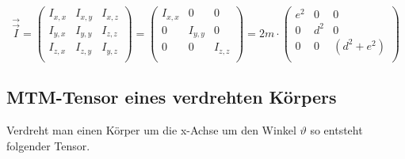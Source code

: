 \begin{equation}
    \vec{\vec{I}} =
    \begin{pmatrix}
        I_{x,x} & I_{x,y} & I_{x,z} \\
        I_{y,x} & I_{y,y} & I_{z,z} \\
        I_{z,x} & I_{z,y} & I_{y,z} \\
    \end{pmatrix} =
    \begin{pmatrix}
        I_{x,x} & 0       & 0       \\
        0       & I_{y,y} & 0       \\
        0       & 0       & I_{z,z} \\
    \end{pmatrix} =
    2m \cdot
    \begin{pmatrix}
        e^2 & 0   & 0           \\
        0   & d^2 & 0           \\
        0   & 0   & (d^2 + e^2) \\
    \end{pmatrix}
\end{equation}


\subsection{MTM-Tensor eines verdrehten K\"orpers}

Verdreht man einen K\"orper um die x-Achse um den Winkel $\vartheta$ so entsteht folgender Tensor.

